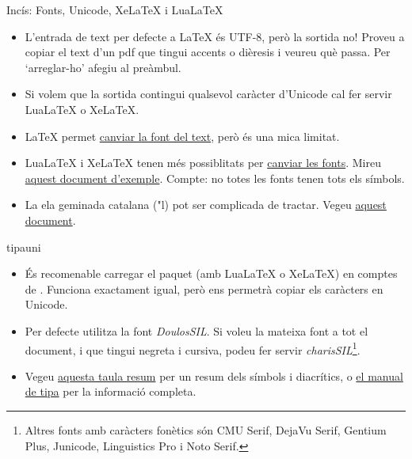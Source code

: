 \begin{frame}[fragile]{Incís: Fonts, Unicode, Xe\LaTeX{} i Lua\LaTeX{}}

\begin{itemize} 
    \item L'entrada de text per defecte a \LaTeX{} és UTF-8, però la sortida no!
    Proveu a copiar el text d'un pdf que tingui accents o dièresis i veureu què passa.
    Per `arreglar-ho' afegiu  al preàmbul.
    \item Si volem que la sortida contingui qualsevol caràcter d'Unicode cal fer servir Lua\LaTeX{} o Xe\LaTeX.
    \item \LaTeX{} permet \href{https://www.overleaf.com/learn/latex/Font_typefaces}{canviar la font del text}, però és una mica limitat. 
    \item Lua\LaTeX{} i Xe\LaTeX{} tenen més possiblitats per \href{https://www.overleaf.com/learn/latex/XeLaTeX}{canviar les fonts}. Mireu \href{https://www.overleaf.com/read/qhjpxrztjjhg\#fa21ab}{aquest document d'exemple}.
    \alert{Compte}: no totes les fonts tenen tots els símbols. 
    \item La ela geminada catalana ("l) pot ser complicada de tractar. Vegeu \href{https://www.overleaf.com/read/qzvfzjwgqwgd#389fd3}{aquest document}.
\end{itemize}
\end{frame}

\begin{frame}[fragile]{tipauni}
\begin{itemize}
    \item És recomenable carregar el paquet  (amb Lua\LaTeX{} o Xe\LaTeX) en comptes de . Funciona exactament igual, però ens permetrà copiar els caràcters en Unicode.
    \item Per defecte utilitza la font \emph{DoulosSIL}. Si voleu la mateixa font a tot el document, i que tingui negreta i cursiva, podeu fer servir \emph{charisSIL}\footnote{Altres fonts amb caràcters fonètics són CMU Serif, DejaVu Serif, Gentium Plus, Junicode, Linguistics Pro i Noto Serif.}.
    \item Vegeu \href{https://jon.dehdari.org/tutorials/tipachart_mod.pdf}{aquesta taula resum} per un resum dels símbols i diacrítics, o \href{https://ctan.org/pkg/tipa}{el manual de tipa} per la informació completa.
\end{itemize}
\end{frame}


